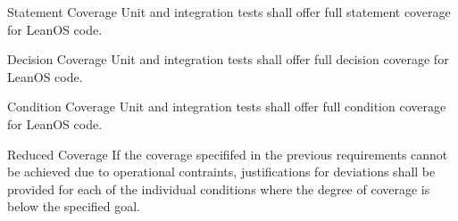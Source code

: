  {Statement Coverage}{%
Unit and integration tests shall offer full statement coverage for LeanOS code.%
}{}%

 {Decision Coverage}{%
Unit and integration tests shall offer full decision coverage for LeanOS code.%
}{}%

 {Condition Coverage}{%
Unit and integration tests shall offer full condition coverage for LeanOS code.%
}{}%

 {Reduced Coverage}{%
If the coverage specififed in the previous requirements cannot be achieved %
due to operational contraints, justifications for deviations shall be provided %
for each of the individual conditions where the degree of coverage is below %
the specified goal. %
}{}%











